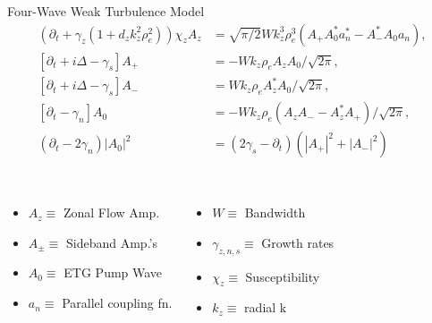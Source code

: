 \documentclass[aspectratio=43]{beamer}
\begin{document}
   \begin{frame}{Four-Wave Weak Turbulence Model}
      \vspace*{-1cm}
      \begin{equation}
      \begin{aligned}
         (\partial_{t}+\gamma_{z}(1+d_{z}k_{z}^{2}\rho_{e}^{2}))\chi_{z}A_{z}\nonumber &=
         \sqrt{\pi/2} W k_{z}^{3}\rho_{e}^{3}(A_{+}A^{*}_{0}a_{n}^{*}-A^{*}_{-}A_{0}a_{n}),         \\
         [\partial_{t}+ i\Delta-\gamma_{s}]A_{+}&=-W k_{z}\rho_{e}A_{z}A_{0}/\sqrt{2\pi},           \\
         [\partial_{t}+ i\Delta-\gamma_{s}]A_{-}&=W k_{z}\rho_{e}A^{*}_{z}A_{0}/\sqrt{2\pi},        \\
         [\partial_{t}-\gamma_{n}]A_{0}&=-W k_{z}\rho_{e}( A_{z}A_{-}-A^{*}_{z}A_{+})/\sqrt{2\pi},  \\
         (\partial_{t}-2\gamma_{n})|A_{0}|^{2}&=(2\gamma_{s}-\partial_{t})(|A_{+}|^{2}+|A_{-}|^{2}) \\
      \end{aligned}
      \end{equation}
      \begin{columns}
      \hspace{1cm}
         \begin{itemize}
            \item $A_z\equiv$ Zonal Flow Amp.
            \item $A_{\pm}\equiv$ Sideband Amp.'s
            \item $A_0\equiv$ ETG Pump Wave
            \item $a_n\equiv$ Parallel coupling fn.
         \end{itemize}
         \begin{itemize}
            \item $W\equiv$ Bandwidth
            \item $\gamma_{z,n,s}\equiv$ Growth rates
            \item $\chi_z\equiv$ Susceptibility
            \item $k_z\equiv$ radial k
         \end{itemize}
      \end{columns}
   \end{frame}
\end{document}
